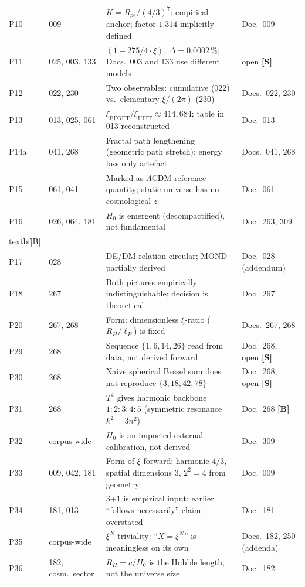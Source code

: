 \begin{longtable}{@{}p{1.2cm}p{3.4cm}p{5.8cm}p{3.4cm}@{}}
P10 & 009 & $K = R_{pe}/(4/3)^7$: empirical anchor; factor $1.314$ implicitly defined & Doc.~009 \\
P11 & 025, 003, 133 & $(1-275/4\cdot\xi)$, $\Delta=0.0002\,\%$; Docs.~003 and 133 use different models & open \textbf{[S]} \\
P12 & 022, 230 & Two observables: cumulative (022) vs.\ elementary $\xi/(2\pi)$ (230) & Docs.~022, 230 \\
P13 & 013, 025, 061 & $\xi_\text{FFGFT}/\xi_\text{UIFT} \approx 414{,}684$; table in 013 reconstructed & Doc.~013 \\
P14a & 041, 268 & Fractal path lengthening (geometric path stretch); energy loss only artefact & Docs.~041, 268 \\
P15 & 061, 041 & Marked as $\Lambda$CDM reference quantity; static universe has no cosmological $z$ & Doc.~061 \\
P16 & 026, 064, 181 & $H_0$ is emergent (decompactified), not fundamental & Doc.~263, 309 \\textbf{[B]} \\
P17 & 028 & DE/DM relation circular; MOND partially derived & Doc.~028 (addendum) \\
P18 & 267 & Both pictures empirically indistinguishable; decision is theoretical & Doc.~267 \\
P20 & 267, 268 & Form: dimensionless $\xi$-ratio ($R_H/\ell_P$) is fixed & Docs.~267, 268 \\
P29 & 268 & Sequence $\{1,6,14,26\}$ read from data, not derived forward & Doc.~268, open \textbf{[S]} \\
P30 & 268 & Naive spherical Bessel sum does not reproduce $\{3,18,42,78\}$ & Doc.~268, open \textbf{[S]} \\
P31 & 268 & $T^4$ gives harmonic backbone $1:2:3:4:5$ (symmetric resonance $k^2=3n^2$) & Doc.~268 \textbf{[B]} \\
P32 & corpus-wide & $H_0$ is an imported external calibration, not derived & Doc.~309 \\
P33 & 009, 042, 181 & Form of $\xi$ forward: harmonic $4/3$, spatial dimensions $3$, $2^2=4$ from geometry & Doc.~009 \\
P34 & 181, 013 & 3+1 is empirical input; earlier ``follows necessarily'' claim overstated & Doc.~181 \\
P35 & corpus-wide & $\xi^N$ triviality: ``$X=\xi^N$'' is meaningless on its own & Docs.~182, 250 (addenda) \\
P36 & 182, cosm.\ sector & $R_H = c/H_0$ is the Hubble length, not the universe size & Doc.~182 \\

\end{longtable}
